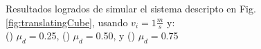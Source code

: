 \documentclass{article}
\begin{document}
\begin{figure}[H]%
  \centering
  \vspace*{0ex}
 \vspace*{0ex}
   \captionsetup{justification=centering}
  \caption{Resultados logrados de simular el sistema descripto en Fig. \ref{fig:translatingCube}, usando $v_i = 1 \frac{m}{s}$ y: \\ (\protect{}) $\mu_d=$0.25, (\protect{}) $\mu_d=$0.50, y (\protect{}) $\mu_d=$0.75}%
  \label{fig3} %
  \vspace*{0ex}
\end{figure}
\vspace{3ex}
\end{document}
